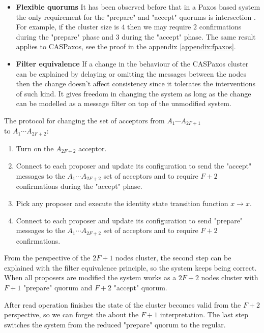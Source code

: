 \documentclass[12pt]{article}
\theoremstyle{definition}
\begin{document}
\begin{itemize}
  \item {\bf Flexible quorums} It has been observed before that in a Paxos based system the only requirement for the "prepare" and "accept" quorums is intersection \cite{abcds}\cite{vertical}\cite{fpaxos}. For example, if the cluster size is $4$ then we may require $2$ confirmations during the "prepare" phase and $3$ during the "accept" phase. The same result applies to CASPaxos, see the proof in the appendix \ref{appendix:fpaxos}.
  
  \item {\bf Filter equivalence} If a change in the behaviour of the CASPaxos cluster can be explained by delaying or omitting the messages between the nodes then the change doesn't affect consistency since it tolerates the interventions of such kind. It gives freedom in changing the system as long as the change can be modelled as a message filter on top of the unmodified system.
\end{itemize}

The protocol for changing the set of acceptors from $A_1 \cdots A_{2F+1}$ \\
to $A_1 \cdots A_{2F+2}$:
\begin{enumerate}
  \item Turn on the $A_{2F+2}$ acceptor.
  \item Connect to each proposer and update its configuration to send the "accept" messages to the $A_1 \cdots A_{2F+2}$ set of acceptors and to require $F+2$ confirmations during the "accept" phase.
  \item Pick any proposer and execute the identity state transition function $x \to x$.
  \item Connect to each proposer and update its configuration to send "prepare" messages to the $A_1 \cdots A_{2F+2}$ set of acceptors and to require $F+2$ confirmations.
\end{enumerate}

From the perspective of the $2F+1$ nodes cluster, the second step can be explained with the filter equivalence principle, so the system keeps being correct. When all proposers are modified the system works as a $2F+2$ nodes cluster with $F+1$ "prepare" quorum and $F+2$ "accept" quorum.

After read operation finishes the state of the cluster becomes valid from the $F+2$ perspective, so we can forget the about the $F+1$ interpretation. The last step switches the system from the reduced "prepare" quorum to the regular.
\end{document}
